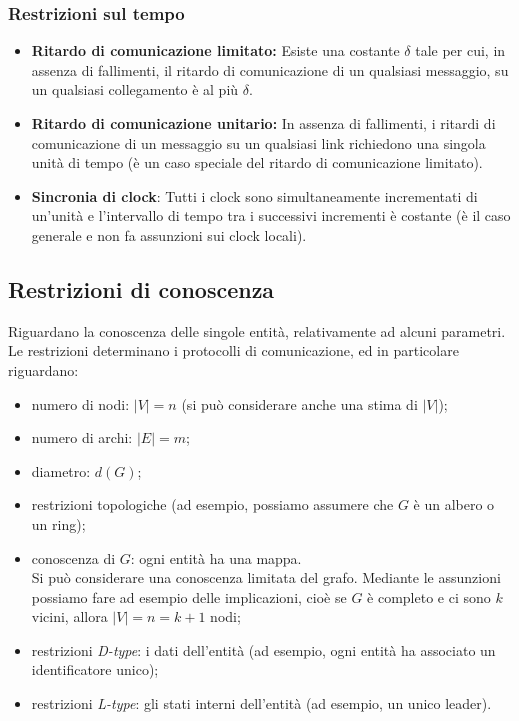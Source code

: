 \subsubsection{Restrizioni sul tempo}

\begin{itemize}
    \item \textbf{Ritardo di comunicazione limitato:} Esiste una costante $\delta$
          tale per cui, in assenza di fallimenti, il ritardo di comunicazione di un
          qualsiasi messaggio, su un qualsiasi collegamento è al più $\delta$.
    \item \textbf{Ritardo di comunicazione unitario:} In assenza di fallimenti, i
          ritardi di comunicazione di un messaggio su un qualsiasi link richiedono una
          singola unità di tempo (è un caso speciale del ritardo di comunicazione
          limitato).
    \item \textbf{Sincronia di clock}: Tutti i clock sono simultaneamente
          incrementati di un'unità e l'intervallo di tempo tra i successivi incrementi è
          costante (è il caso generale e non fa assunzioni sui clock locali).
\end{itemize}

\subsection{Restrizioni di conoscenza}
Riguardano la conoscenza delle singole entità, relativamente ad alcuni
parametri. \\
Le restrizioni determinano i protocolli di comunicazione, ed in particolare
riguardano:

\begin{itemize}
    \item numero di nodi: $|V| = n$ (si può considerare anche una stima di $|V|$);
    \item numero di archi: $|E| = m$;
    \item diametro: $d(G)$;
    \item restrizioni topologiche (ad esempio, possiamo assumere che $G$ è un
          albero o un ring);
    \item conoscenza di $G$: ogni entità ha una mappa. \\ Si può considerare una
          conoscenza limitata del grafo. Mediante le assunzioni possiamo fare ad esempio
          delle implicazioni, cioè se $G$ è completo e ci sono $k$ vicini, allora $|V| =
              n = k+1$ nodi;
    \item restrizioni \textit{D-type}: i dati dell'entità (ad esempio, ogni entità
          ha associato un identificatore unico);
    \item restrizioni \textit{L-type}: gli stati interni dell'entità (ad esempio,
          un unico leader).
\end{itemize}

